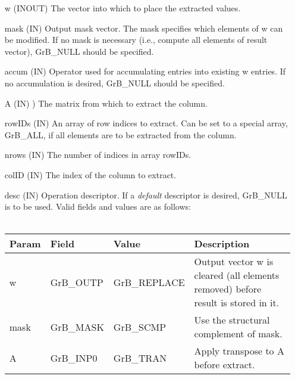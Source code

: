 \begin{itemize}[leftmargin=1in]
    \item[{\sf w}]      ({\sf INOUT})  The vector into which to place the extracted values.

    \item[{\sf mask}]   ({\sf IN}) Output mask vector. The mask
    specifies which elements of {\sf w} can be modified.
    If no mask is necessary (i.e., compute all elements of result
    vector), {\sf GrB\_NULL} should be specified.

    \item[{\sf accum}]  ({\sf IN})  Operator used for accumulating entries into existing {\sf w} entries. 
			If no accumulation is desired, {\sf GrB\_NULL} should be specified.

    \item[{\sf A}]      ({\sf IN}) ) The matrix from which to extract the column.

    \item[{\sf rowIDs}] ({\sf IN})   An array of row indices to extract. Can
                              be set to a special array, {\sf GrB\_ALL}, if all elements
                              are to be extracted from the column.
    \item[{\sf nrows}]  ({\sf IN}) The number of indices in array {\sf rowIDs}.
    \item[{\sf colID}]  ({\sf IN}) The index of the column to extract.

    \item[{\sf desc}]   ({\sf IN}) Operation descriptor. If a
    \emph{default} descriptor is desired, {\sf GrB\_NULL} is to be
    used.  Valid fields and values are as follows: \\ ~ \\
    \begin{tabular}{lllp{2.5in}}
    Param & Field  & Value & Description \\
    \hline
    {\sf w}    & {\sf GrB\_OUTP} & {\sf GrB\_REPLACE} & Output vector {\sf w} is cleared (all elements removed) before result is stored in it. \\
    {\sf mask} & {\sf GrB\_MASK} & {\sf GrB\_SCMP} & Use the structural complement of {\sf mask}. \\
    {\sf A}    & {\sf GrB\_INP0} & {\sf GrB\_TRAN} & Apply transpose to {\sf A} before extract. \\
    \end{tabular}
\end{itemize}

